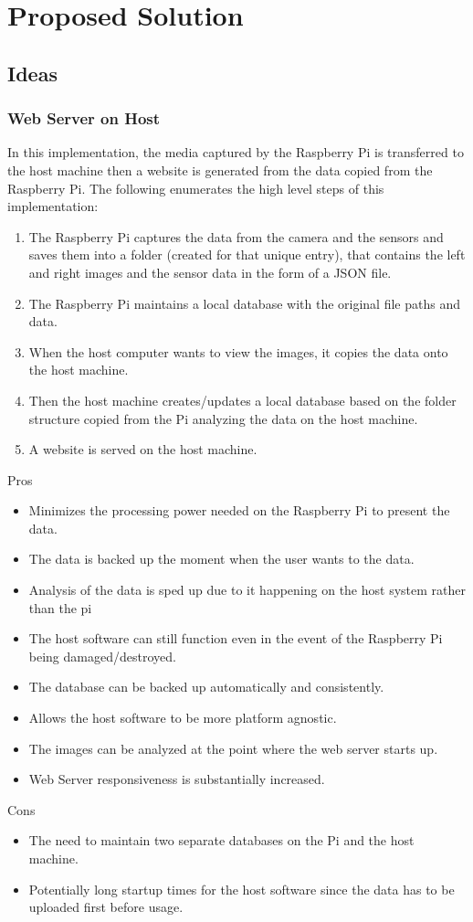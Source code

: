 \documentclass{article}
\begin{document}
\section{Proposed Solution}
\subsection{Ideas}
\subsubsection{Web Server on Host}
In this implementation, the media captured by the Raspberry Pi is transferred to the host machine then a website is generated from the data copied from the Raspberry Pi. The following enumerates the high level steps of this implementation:
\begin{enumerate}
	\item The Raspberry Pi captures the data from the camera and the sensors and saves them into a folder (created for that unique entry), that contains the left and right images and the sensor data in the form of a JSON file.
	\item The Raspberry Pi maintains a local database with the original file paths and data.
	\item When the host computer wants to view the images, it copies the data onto the host machine.
	\item Then the host machine creates/updates a local database based on the folder structure copied from the Pi analyzing the data on the host machine.
	\item A website is served on the host machine.
\end{enumerate}
Pros
\begin{itemize}
	\item Minimizes the processing power needed on the Raspberry Pi to present the data.
	\item The data is backed up the moment when the user wants to the data.
	\item Analysis of the data is sped up due to it happening on the host system rather than the pi
	\item The host software can still function even in the event of the Raspberry Pi being damaged/destroyed.
	\item The database can be backed up automatically and consistently.
	\item Allows the host software to be more platform agnostic.
	\item The images can be analyzed at the point where the web server starts up.
	\item Web Server responsiveness is substantially increased.
\end{itemize}
Cons
\begin{itemize}
	\item The need to maintain two separate databases on the Pi and the host machine.
	\item Potentially long startup times for the host software since the data has to be uploaded first before usage.
\end{itemize}
\end{document}
